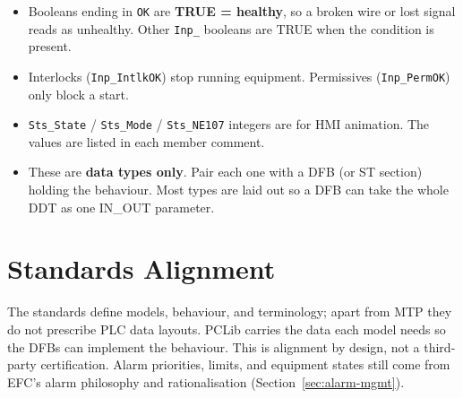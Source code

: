 \begin{itemize}[itemsep=1pt]

  \item Booleans ending in \texttt{OK} are \textbf{TRUE = healthy}, so a broken wire or lost signal reads as unhealthy. Other \texttt{Inp\_} booleans are TRUE when the condition is present.

  \item Interlocks (\texttt{Inp\_IntlkOK}) stop running equipment. Permissives (\texttt{Inp\_PermOK}) only block a start.

  \item \texttt{Sts\_State} /\allowbreak{} \texttt{Sts\_Mode} /\allowbreak{} \texttt{Sts\_NE107} integers are for HMI animation. The values are listed in each member comment.

  \item These are \textbf{data types only}. Pair each one with a DFB (or ST section) holding the behaviour. Most types are laid out so a DFB can take the whole DDT as one IN\_OUT parameter.

\end{itemize}


\section{Standards Alignment}

The standards define models, behaviour, and terminology; apart from MTP they do not prescribe PLC data layouts. PCLib carries the data each model needs so the DFBs can implement the behaviour. This is alignment by design, not a third-party certification. Alarm priorities, limits, and equipment states still come from EFC's alarm philosophy and rationalisation (Section~\ref{sec:alarm-mgmt}).

